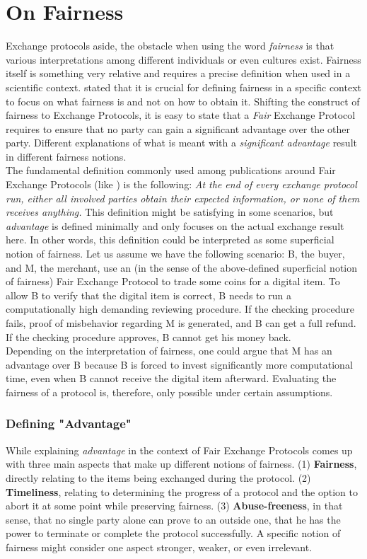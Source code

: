 \documentclass{cacthesis}
\begin{document}
		\section{On Fairness}
		Exchange protocols aside, the obstacle when using the word \textit{fairness} is that various interpretations among different individuals or even cultures exist. Fairness itself is something very relative and requires a precise definition when used in a scientific context. \cite{10.1007/3-540-36552-4_31} stated that it is crucial for defining fairness in a specific context to focus on what fairness is and not on how to obtain it. 
        Shifting the construct of fairness to Exchange Protocols, it is easy to state that a \textit{Fair} Exchange Protocol requires to ensure that no party can gain a significant advantage over the other party. Different explanations of what is meant with a \textit{significant advantage} result in different fairness notions. \\
        The fundamental definition commonly used among publications around Fair Exchange Protocols (like \cite{10.1145/266420.266426} \cite{asyncOptiFairEx1998} \cite{remarksOnFairEx2000})  is the following: \textit{At the end of every exchange protocol run, either all involved parties obtain their expected information, or none of them receives anything.}
        This definition might be satisfying in some scenarios, but \textit{advantage} is defined minimally and only focuses on the actual exchange result here. In other words, this definition could be interpreted as some superficial notion of fairness. Let us assume we have the following scenario: B, the buyer, and M, the merchant, use an (in the sense of the above-defined superficial notion of fairness) Fair Exchange Protocol to trade some coins for a digital item. To allow B to verify that the digital item is correct, B needs to run a computationally high demanding reviewing procedure. If the checking procedure fails, proof of misbehavior regarding M is generated, and B can get a full refund. If the checking procedure approves, B cannot get his money back. \\
        Depending on the interpretation of fairness, one could argue that M has an advantage over B because B is forced to invest significantly more computational time, even when B cannot receive the digital item afterward. Evaluating the fairness of a protocol is, therefore, only possible under certain assumptions. 
        \subsubsection{Defining "Advantage"}
        While explaining \textit{advantage} in the context of Fair Exchange Protocols \cite{10.1007/3-540-36552-4_31} comes up with three main aspects that make up different notions of fairness. (1) \textbf{Fairness}, directly relating to the items being exchanged during the protocol. (2) \textbf{Timeliness}, relating to determining the progress of a protocol and the option to abort it at some point while preserving fairness. (3) \textbf{Abuse-freeness}, in that sense, that no single party alone can prove to an outside one, that he has the power to terminate or complete the protocol successfully. A specific notion of fairness might consider one aspect stronger, weaker, or even irrelevant. 
\end{document}
